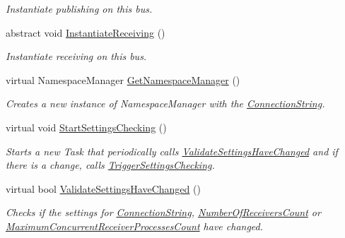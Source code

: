 \begin{DoxyCompactItemize}
\begin{DoxyCompactList}\small\item\em Instantiate publishing on this bus. \end{DoxyCompactList}\item 
abstract void \hyperlink{classCqrs_1_1Azure_1_1ServiceBus_1_1AzureBus_ac9f66dd531dcde49be72ba8f2cb28e9b_ac9f66dd531dcde49be72ba8f2cb28e9b}{Instantiate\+Receiving} ()
\begin{DoxyCompactList}\small\item\em Instantiate receiving on this bus. \end{DoxyCompactList}\item 
virtual Namespace\+Manager \hyperlink{classCqrs_1_1Azure_1_1ServiceBus_1_1AzureBus_ae7e6f920864cceec2850be9baac84803_ae7e6f920864cceec2850be9baac84803}{Get\+Namespace\+Manager} ()
\begin{DoxyCompactList}\small\item\em Creates a new instance of Namespace\+Manager with the \hyperlink{classCqrs_1_1Azure_1_1ServiceBus_1_1AzureBus_aaccdbc8cd25d3ae4f1a2801d2ad02a96_aaccdbc8cd25d3ae4f1a2801d2ad02a96}{Connection\+String}. \end{DoxyCompactList}\item 
virtual void \hyperlink{classCqrs_1_1Azure_1_1ServiceBus_1_1AzureBus_acb7f47329c17646805545e78d0776efe_acb7f47329c17646805545e78d0776efe}{Start\+Settings\+Checking} ()
\begin{DoxyCompactList}\small\item\em Starts a new Task that periodically calls \hyperlink{classCqrs_1_1Azure_1_1ServiceBus_1_1AzureBus_a9fa1f5a74819100c40d8079ac6a6adb9_a9fa1f5a74819100c40d8079ac6a6adb9}{Validate\+Settings\+Have\+Changed} and if there is a change, calls \hyperlink{classCqrs_1_1Azure_1_1ServiceBus_1_1AzureBus_ae501f84c4983bfa3b2ae4551749ac998_ae501f84c4983bfa3b2ae4551749ac998}{Trigger\+Settings\+Checking}. \end{DoxyCompactList}\item 
virtual bool \hyperlink{classCqrs_1_1Azure_1_1ServiceBus_1_1AzureBus_a9fa1f5a74819100c40d8079ac6a6adb9_a9fa1f5a74819100c40d8079ac6a6adb9}{Validate\+Settings\+Have\+Changed} ()
\begin{DoxyCompactList}\small\item\em Checks if the settings for \hyperlink{classCqrs_1_1Azure_1_1ServiceBus_1_1AzureBus_aaccdbc8cd25d3ae4f1a2801d2ad02a96_aaccdbc8cd25d3ae4f1a2801d2ad02a96}{Connection\+String}, \hyperlink{classCqrs_1_1Azure_1_1ServiceBus_1_1AzureBus_a65ca2b61bf8f2dba9d0e0f54ec64c2b9_a65ca2b61bf8f2dba9d0e0f54ec64c2b9}{Number\+Of\+Receivers\+Count} or \hyperlink{classCqrs_1_1Azure_1_1ServiceBus_1_1AzureBus_a6b517888d91c6a5b026cb5857e75a04f_a6b517888d91c6a5b026cb5857e75a04f}{Maximum\+Concurrent\+Receiver\+Processes\+Count} have changed. \end{DoxyCompactList}\item 

\end{DoxyCompactItemize}
